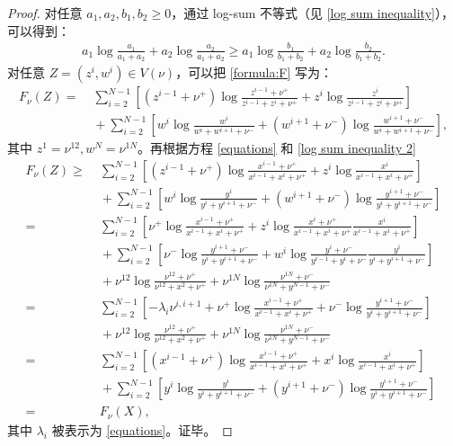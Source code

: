 \begin{proof}
    对任意 $a_1,a_2,b_1,b_2\ge 0$，通过 log-sum 不等式（见 \eqref{log sum inequality}），可以得到：
    \begin{align}\label{log sum inequality 2}
        a_1\log\frac{a_1}{a_1+a_2}+a_2\log\frac{a_2}{a_1+a_2}\ge a_1\log\frac{b_1}{b_1+b_2}+a_2\log\frac{b_2}{b_1+b_2}.
    \end{align}
    对任意 $Z=(z^i,w^i)\in V(\nu)$，可以把 \eqref{formula:F} 写为：
    \begin{align*}
        F_{\nu}(Z)
        =&\;\sum_{i=2}^{N-1}\left[ \left(z^{i-1}+\nu^+\right)\log\frac{z^{i-1}+\nu^+}{z^{i-1}+z^{i}+\nu^+} + z^{i}\log\frac{z^{i}}{z^{i-1}+z^{i}+\nu^+}  \right]\\
        &\;+\sum_{i=2}^{N-1}  \left[w^{i}\log\frac{w^{i}}{w^{i} +w^{i+1} +\nu^-} + \left(w^{i+1} +\nu^-\right)\log\frac{w^{i+1} +\nu^-}{w^{i} +w^{i+1} +\nu^-}\right],
    \end{align*}
    其中 $z^{1}=\nu^{12},w^{N}=\nu^{1N}$。再根据方程 \eqref{equations} 和 \eqref{log sum inequality 2}
    \begin{align*}
        F_{\nu}(Z)\ge &\;\sum_{i=2}^{N-1}\left[ \left(z^{i-1}+\nu^+\right)\log\frac{x^{i-1}+\nu^+}{x^{i-1}+x^{i}+\nu^+} + z^{i}\log\frac{x^{i}}{x^{i-1}+x^{i}+\nu^+}  \right]\\
        &\;+\sum_{i=2}^{N-1}  \left[w^{i}\log\frac{y^{i}}{y^{i} +y^{i+1} +\nu^-} + \left(w^{i+1} +\nu^-\right)\log\frac{y^{i+1} +\nu^-}{y^{i} +y^{i+1} +\nu^-}\right]\\
        =&\;\sum_{i=2}^{N-1}\left[ \nu^+\log\frac{x^{i-1}+\nu^+}{x^{i-1}+x^{i}+\nu^+} + z^{i}\log\frac{x^{i}+\nu^{+}}{x^{i-1}+x^{i}+\nu^{+}}\frac{x^{i}}{x^{i-1}+x^{i}+\nu^+}  \right]\\
        &\;+\sum_{i=2}^{N-1}  \left[\nu^-\log\frac{y^{i+1} +\nu^-}{y^{i} +y^{i+1} +\nu^-}+w^{i}\log\frac{y^{i}+\nu^{-}}{y^{i-1}+y^{i}+\nu^{-}}\frac{y^{i}}{y^{i} +y^{i+1} +\nu^-}  \right]\\
        &\;+\nu^{12}\log\frac{\nu^{12}+\nu^{+}}{\nu^{12}+x^{2}+\nu^{+}}+\nu^{1N}\log\frac{\nu^{1N}+\nu^{-}}{\nu^{1N}+y^{N-1}+\nu^{-}}\\
        =&\;\sum_{i=2}^{N-1}\left[-\lambda_i\nu^{i,i+1}+\nu^+\log\frac{x^{i-1}+\nu^+}{x^{i-1}+x^{i}+\nu^+}+\nu^-\log\frac{y^{i+1} +\nu^-}{y^{i} +y^{i+1} +\nu^-}\right]\\
        &\;+\nu^{12}\log\frac{\nu^{12}+\nu^{+}}{\nu^{12}+x^{2}+\nu^{+}}+\nu^{1N}\log\frac{\nu^{1N}+\nu^{-}}{\nu^{1N}+y^{N-1}+\nu^{-}}\\
        =&\;\sum_{i=2}^{N-1}\left[ \left(x^{i-1}+\nu^+\right)\log\frac{x^{i-1}+\nu^+}{x^{i-1}+x^{i}+\nu^+} + x^{i}\log\frac{x^{i}}{x^{i-1}+x^{i}+\nu^+}  \right]\\
        &\;+\sum_{i=2}^{N-1}  \left[y^{i}\log\frac{y^{i}}{y^{i} +y^{i+1} +\nu^-} + \left(y^{i+1} +\nu^-\right)\log\frac{y^{i+1} +\nu^-}{y^{i} +y^{i+1} +\nu^-}\right]\\
        =&\;F_{\nu}(X),
        \end{align*}
        其中 $\lambda_i$ 被表示为 \eqref{equations}。证毕。
\end{proof}

